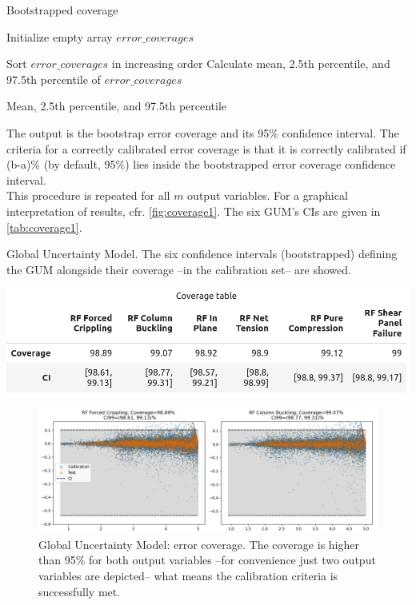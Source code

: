\begin{algorithm}
	\caption{Bootstrapped coverage}
	\label{algo:coverage}
	
	Initialize empty array $error\_coverages$\;
	
	
	Sort $error\_coverages$ in increasing order\;
	Calculate mean, 2.5th percentile, and 97.5th percentile of $error\_coverages$\;
	
	\Return Mean, 2.5th percentile, and 97.5th percentile\;
\end{algorithm}
%
\indent The output is the bootstrap error coverage and its 95\% confidence interval. The criteria for a correctly calibrated error coverage is that it is correctly calibrated if (b-a)\% (by default, 95\%) lies inside the bootstrapped error coverage confidence interval.\\
\indent This procedure is repeated for all $m$ output variables. For a graphical interpretation of results, cfr. \autoref{fig:coverage1}. The six GUM's CIs are given in  \autoref{tab:coverage1}.\\
%
\begin{table}[!htb]
	\centering
	\caption{Global Uncertainty Model. The six confidence intervals (bootstrapped) defining the GUM alongside their coverage --in the calibration set-- are showed.}
	\includegraphics[scale=\tabscale]{Figures/uncertainty/coveragetab1.png}
	\label{tab:coverage1}
\end{table}
\begin{figure}[!htb]
	\centering
	\includegraphics[width=\textwidth]{Figures/uncertainty/coverage1.png}
	\caption{Global Uncertainty Model: error coverage. The coverage is higher than 95\% for both output variables --for convenience just two output variables are depicted-- what means the calibration criteria is successfully met.}
	\label{fig:coverage1}
\end{figure}

